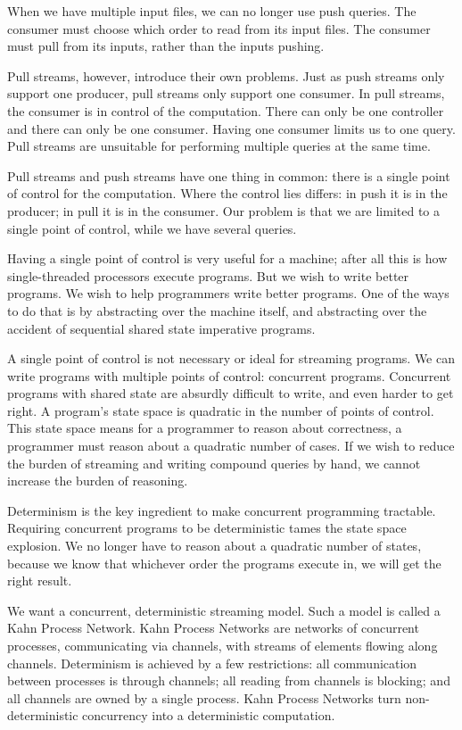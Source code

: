 When we have multiple input files, we can no longer use push queries.
The consumer must choose which order to read from its input files.
The consumer must pull from its inputs, rather than the inputs pushing.

Pull streams, however, introduce their own problems.
Just as push streams only support one producer, pull streams only support one consumer.
In pull streams, the consumer is in control of the computation.
There can only be one controller and there can only be one consumer.
Having one consumer limits us to one query.
Pull streams are unsuitable for performing multiple queries at the same time.


Pull streams and push streams have one thing in common: there is a single point of control for the computation.
Where the control lies differs: in push it is in the producer; in pull it is in the consumer.
Our problem is that we are limited to a single point of control, while we have several queries.

Having a single point of control is very useful for a machine; after all this is how single-threaded processors execute programs.
But we wish to write better programs.
We wish to help programmers write better programs.
One of the ways to do that is by abstracting over the machine itself, and abstracting over the accident of sequential shared state imperative programs.

A single point of control is not necessary or ideal for streaming programs.
We can write programs with multiple points of control: concurrent programs.
Concurrent programs with shared state are absurdly difficult to write, and even harder to get right.
A program's state space is quadratic in the number of points of control.
This state space means for a programmer to reason about correctness, a programmer must reason about a quadratic number of cases.
If we wish to reduce the burden of streaming and writing compound queries by hand, we cannot increase the burden of reasoning.

Determinism is the key ingredient to make concurrent programming tractable.
Requiring concurrent programs to be deterministic tames the state space explosion.
We no longer have to reason about a quadratic number of states, because we know that whichever order the programs execute in, we will get the right result.

We want a concurrent, deterministic streaming model.
Such a model is called a Kahn Process Network.
Kahn Process Networks are networks of concurrent processes, communicating via channels, with streams of elements flowing along channels.
Determinism is achieved by a few restrictions: all communication between processes is through channels; all reading from channels is blocking; and all channels are owned by a single process.
Kahn Process Networks turn non-deterministic concurrency into a deterministic computation.

